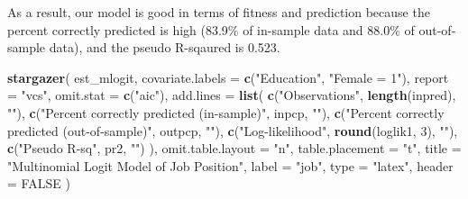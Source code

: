 \documentclass[
  12pt,
]{article}
\newenvironment{Shaded}{\begin{snugshade}}{\end{snugshade}}
\newcommand{\DataTypeTok}[1]{\textcolor[rgb]{0.13,0.29,0.53}{#1}}
\newcommand{\DecValTok}[1]{\textcolor[rgb]{0.00,0.00,0.81}{#1}}
\newcommand{\KeywordTok}[1]{\textcolor[rgb]{0.13,0.29,0.53}{\textbf{#1}}}
\newcommand{\NormalTok}[1]{#1}
\newcommand{\OtherTok}[1]{\textcolor[rgb]{0.56,0.35,0.01}{#1}}
\newcommand{\StringTok}[1]{\textcolor[rgb]{0.31,0.60,0.02}{#1}}
\begin{document}
As a result, our model is good in terms of fitness and prediction
because the percent correctly predicted is high (83.9\% of in-sample
data and 88.0\% of out-of-sample data), and the pseudo R-sqaured is
0.523.

\begin{Shaded}
\begin{Highlighting}[]
\KeywordTok{stargazer}\NormalTok{(}
\NormalTok{  est\_mlogit,}
  \DataTypeTok{covariate.labels =} \KeywordTok{c}\NormalTok{(}\StringTok{"Education"}\NormalTok{, }\StringTok{"Female = 1"}\NormalTok{),}
  \DataTypeTok{report =} \StringTok{"vcs"}\NormalTok{, }\DataTypeTok{omit.stat =} \KeywordTok{c}\NormalTok{(}\StringTok{"aic"}\NormalTok{),}
  \DataTypeTok{add.lines =} \KeywordTok{list}\NormalTok{(}
    \KeywordTok{c}\NormalTok{(}\StringTok{"Observations"}\NormalTok{, }\KeywordTok{length}\NormalTok{(inpred), }\StringTok{""}\NormalTok{),}
    \KeywordTok{c}\NormalTok{(}\StringTok{"Percent correctly predicted (in{-}sample)"}\NormalTok{, inpcp, }\StringTok{""}\NormalTok{),}
    \KeywordTok{c}\NormalTok{(}\StringTok{"Percent correctly predicted (out{-}of{-}sample)"}\NormalTok{, outpcp, }\StringTok{""}\NormalTok{),}
    \KeywordTok{c}\NormalTok{(}\StringTok{"Log{-}likelihood"}\NormalTok{, }\KeywordTok{round}\NormalTok{(loglik1, }\DecValTok{3}\NormalTok{), }\StringTok{""}\NormalTok{),}
    \KeywordTok{c}\NormalTok{(}\StringTok{"Pseudo R{-}sq"}\NormalTok{, pr2, }\StringTok{""}\NormalTok{)}
\NormalTok{  ),}
  \DataTypeTok{omit.table.layout =} \StringTok{"n"}\NormalTok{, }\DataTypeTok{table.placement =} \StringTok{"t"}\NormalTok{,}
  \DataTypeTok{title =} \StringTok{"Multinomial Logit Model of Job Position"}\NormalTok{,}
  \DataTypeTok{label =} \StringTok{"job"}\NormalTok{,}
  \DataTypeTok{type =} \StringTok{"latex"}\NormalTok{, }\DataTypeTok{header =} \OtherTok{FALSE}  
\NormalTok{)}
\end{Highlighting}
\end{Shaded}
\end{document}
